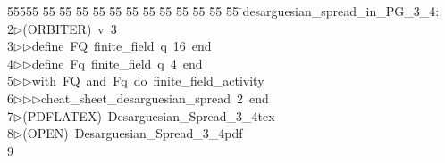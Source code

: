 %
%
\begin{tabbing}
55555 \= 55 \= 55 \= 55 \= 55 \= 55 \= 55 \= 55 \= 55 \= 55 \= 55 \= 55 \= 55 \= \>desarguesian\_spread\_in\_PG\_3\_4:\\[0pt]
2\>$\triangleright$\>(ORBITER)\ v\ 3\ \\[0pt]
3\>$\triangleright$\>$\triangleright$\>define\ FQ\ finite\_field\ q\ 16\ end\ \\[0pt]
4\>$\triangleright$\>$\triangleright$\>define\ Fq\ finite\_field\ q\ 4\ end\ \\[0pt]
5\>$\triangleright$\>$\triangleright$\>with\ FQ\ and\ Fq\ do\ finite\_field\_activity\ \\[0pt]
6\>$\triangleright$\>$\triangleright$\>$\triangleright$\>cheat\_sheet\_desarguesian\_spread\ 2\ end\\[0pt]
7\>$\triangleright$\>(PDFLATEX)\ Desarguesian\_Spread\_3\_4tex\\[0pt]
8\>$\triangleright$\>(OPEN)\ Desarguesian\_Spread\_3\_4pdf\\[0pt]
9\>\end{tabbing}
